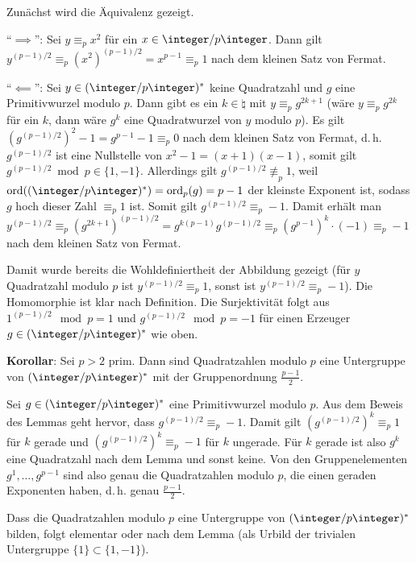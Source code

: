 \begin{Beweis}
    Zunächst wird die Äquivalenz gezeigt.

    "`$\implies$"':
    Sei $y \equiv_p x^2$ für ein $x \in \ZpZ$.
    Dann gilt $y^{(p-1)/2} \equiv_p (x^2)^{(p-1)/2} = x^{p-1} \equiv_p 1$
    nach dem kleinen Satz von Fermat.

    "`$\impliedby$"':
    Sei $y \in (\ZpZ)^\ast$ keine Quadratzahl und $g$ eine Primitivwurzel modulo $p$.
    Dann gibt es ein $k \in \natural$ mit $y \equiv_p g^{2k+1}$
    (wäre $y \equiv_p g^{2k}$ für ein $k$, dann wäre $g^k$ eine Quadratwurzel von $y$ modulo $p$).
    Es gilt $(g^{(p-1)/2})^2 - 1 = g^{p-1} - 1 \equiv_p 0$ nach dem kleinen Satz von Fermat,
    d.\,h. $g^{(p-1)/2}$ ist eine Nullstelle von $x^2 - 1 = (x+1)(x-1)$,
    somit gilt $g^{(p-1)/2} \bmod p \in \{1, -1\}$.
    Allerdings gilt $g^{(p-1)/2} \not\equiv_p 1$, weil $\ord((\ZpZ)^\ast) = \ord_p(g) = p - 1$
    der kleinste Exponent ist, sodass $g$ hoch dieser Zahl $\equiv_p 1$ ist.
    Somit gilt $g^{(p-1)/2} \equiv_p -1$.
    Damit erhält man\\
    $y^{(p-1)/2} \equiv_p (g^{2k+1})^{(p-1)/2} = g^{k(p-1)} g^{(p-1)/2}
    \equiv_p (g^{p-1})^k \cdot (-1) \equiv_p -1$
    nach dem kleinen Satz von Fermat.

    Damit wurde bereits die Wohldefiniertheit der Abbildung gezeigt
    (für $y$ Quadratzahl modulo $p$ ist $y^{(p-1)/2} \equiv_p 1$,
    sonst ist $y^{(p-1)/2} \equiv_p -1$).
    Die Homomorphie ist klar nach Definition.
    Die Surjektivität folgt aus $1^{(p-1)/2} \mod p = 1$ und
    $g^{(p-1)/2} \mod p = -1$ für einen Erzeuger\\
    $g \in (\ZpZ)^\ast$ wie oben.
\end{Beweis}

\linie
\pagebreak

\textbf{Korollar}:
Sei $p > 2$ prim.
Dann sind Quadratzahlen modulo $p$ eine Untergruppe von $(\ZpZ)^\ast$ mit der
Gruppenordnung $\frac{p-1}{2}$.

\begin{Beweis}
    Sei $g \in (\ZpZ)^\ast$ eine Primitivwurzel modulo $p$.
    Aus dem Beweis des Lemmas geht hervor, dass $g^{(p-1)/2} \equiv_p -1$.
    Damit gilt $(g^{(p-1)/2})^k \equiv_p 1$ für $k$ gerade und
    $(g^{(p-1)/2})^k \equiv_p -1$ für $k$ ungerade.
    Für $k$ gerade ist also $g^k$ eine Quadratzahl nach dem Lemma und sonst keine.
    Von den Gruppenelementen $g^1, \dotsc, g^{p-1}$ sind also genau die Quadratzahlen
    modulo $p$, die einen geraden Exponenten haben, d.\,h. genau $\frac{p-1}{2}$.

    Dass die Quadratzahlen modulo $p$
    eine Untergruppe von $(\ZpZ)^\ast$ bilden, folgt elementar
    oder nach dem Lemma (als Urbild der trivialen Untergruppe $\{1\} \subset \{1, -1\}$).
\end{Beweis}

